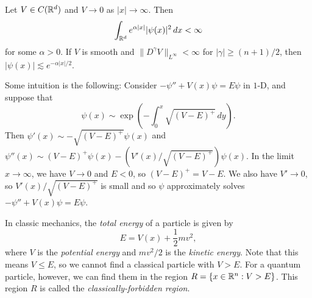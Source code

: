 \begin{theorem}\label{thm:agmon}
  Let $V \in C(\mathbb{R}^d)$ and $V \to 0$ as $|x| \to \infty$.
  Then
  \[
    \int_{\mathbb{R}^d} e^{\alpha |x|} |\psi(x)|^2\, dx < \infty
  \]
  for some $\alpha > 0$. If $V$ is smooth and
  $\|D^\gamma V\|_{L^\infty} < \infty$ for
  $|\gamma| \ge (n + 1) / 2$, then
  $|\psi(x)| \lesssim e^{-\alpha |x| / 2}$.
\end{theorem}

\begin{remark}
  Some intuition is the following:
  Consider $-\psi'' + V(x) \psi = E\psi$ in $1$-D,
  and suppose that
  \[
    \psi(x) \sim \exp\left(-\int_0^x\sqrt{(V - E)^+}\, dy\right).
  \]
  Then $\psi'(x) \sim -\sqrt{(V - E)^+} \psi(x)$ and
  $\psi''(x) \sim (V - E)^+ \psi(x) - (V'(x) / \sqrt{(V - E)^+}) \psi(x)$.
  In the limit $x \to \infty$, we have
  $V \to 0$ and $E < 0$, so
  $(V - E)^+ = V - E$. We also have $V' \to 0$, so
  $V'(x) / \sqrt{(V - E)^+}$ is small and so
  $\psi$ approximately solves
  $-\psi'' + V(x) \psi = E\psi$.
\end{remark}

\begin{remark}
  In classic mechanics, the \emph{total energy} of
  a particle is given by
  \[
    E = V(x) + \frac{1}{2} mv^2,
  \]
  where $V$ is the \emph{potential energy} and $mv^2 / 2$
  is the \emph{kinetic energy}. Note that this means
  $V \le E$, so we cannot find a classical particle
  with $V > E$. For a quantum particle, however,
  we can find them in the region
  $R = \{x \in \mathbb{R}^n : V > E\}$. This region $R$ is
  called the \emph{classically-forbidden region}.
\end{remark}
